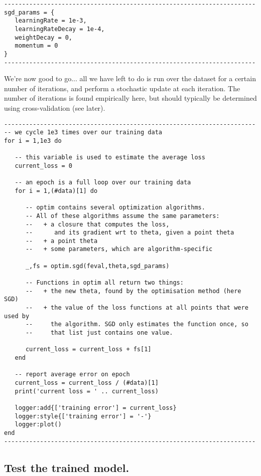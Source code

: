 \begin{verbatim}
----------------------------------------------------------------------
sgd_params = {
   learningRate = 1e-3,
   learningRateDecay = 1e-4,
   weightDecay = 0,
   momentum = 0
}
----------------------------------------------------------------------
\end{verbatim}

We're now good to go... all we have left to do is run over the dataset
for a certain number of iterations, and perform a stochastic update 
at each iteration. The number of iterations is found empirically here,
but should typically be determined using cross-validation (see later).

\begin{verbatim}
----------------------------------------------------------------------
-- we cycle 1e3 times over our training data
for i = 1,1e3 do

   -- this variable is used to estimate the average loss
   current_loss = 0

   -- an epoch is a full loop over our training data
   for i = 1,(#data)[1] do

      -- optim contains several optimization algorithms. 
      -- All of these algorithms assume the same parameters:
      --   + a closure that computes the loss, 
      --      and its gradient wrt to theta, given a point theta
      --   + a point theta
      --   + some parameters, which are algorithm-specific
      
      _,fs = optim.sgd(feval,theta,sgd_params)

      -- Functions in optim all return two things:
      --   + the new theta, found by the optimisation method (here SGD)
      --   + the value of the loss functions at all points that were used by
      --     the algorithm. SGD only estimates the function once, so
      --     that list just contains one value.

      current_loss = current_loss + fs[1]
   end

   -- report average error on epoch
   current_loss = current_loss / (#data)[1]
   print('current loss = ' .. current_loss)
   
   logger:add{['training error'] = current_loss}
   logger:style{['training error'] = '-'}
   logger:plot()  
end
----------------------------------------------------------------------
\end{verbatim}

\subsection{Test the trained model.}


